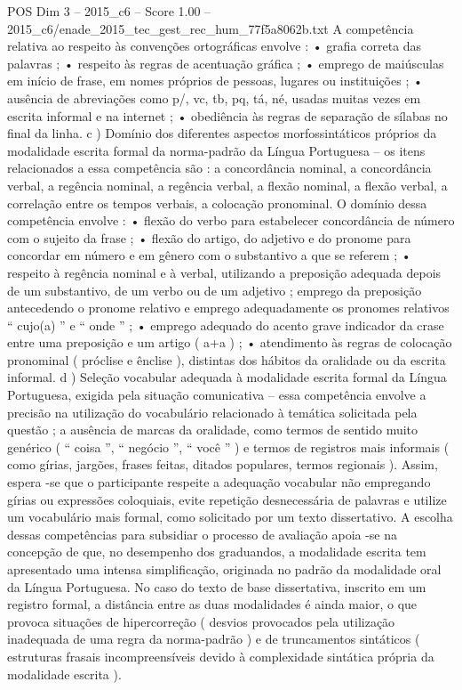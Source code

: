 \begin{textsample}{POS Dim 3 – 2015\_c6 – Score 1.00 – 2015\_c6/enade\_2015\_tec\_gest\_rec\_hum\_77f5a8062b.txt}
A competência relativa ao respeito às convenções ortográficas envolve : • grafia correta das palavras ; • respeito às regras de acentuação gráfica ; • emprego de maiúsculas em início de frase, em nomes próprios de pessoas, lugares ou instituições ; • ausência de abreviações como p/, vc, tb, pq, tá, né, usadas muitas vezes em escrita informal e na internet ; • obediência às regras de separação de sílabas no final da linha. c ) Domínio dos diferentes aspectos morfossintáticos próprios da modalidade escrita formal da norma-padrão da Língua Portuguesa – os itens relacionados a essa competência são : a concordância nominal, a concordância verbal, a regência nominal, a regência verbal, a flexão nominal, a flexão verbal, a correlação entre os tempos verbais, a colocação pronominal.
O domínio dessa competência envolve : • flexão do verbo para estabelecer concordância de número com o sujeito da frase ; • flexão do artigo, do adjetivo e do pronome para concordar em número e em gênero com o substantivo a que se referem ; • respeito à regência nominal e à verbal, utilizando a preposição adequada depois de um substantivo, de um verbo ou de um adjetivo ; emprego da preposição antecedendo o pronome relativo e emprego adequadamente os pronomes relativos “ cujo(a) ” e “ onde ” ; • emprego adequado do acento grave indicador da crase entre uma preposição e um artigo ( a+a ) ; • atendimento às regras de colocação pronominal ( próclise e ênclise ), distintas dos hábitos da oralidade ou da escrita informal. d ) Seleção vocabular adequada à modalidade escrita formal da Língua Portuguesa, exigida pela situação comunicativa – essa competência envolve a precisão na utilização do vocabulário relacionado à temática solicitada pela questão ; a ausência de marcas da oralidade, como termos de sentido muito genérico ( “ coisa ”, “ negócio ”, “ você ” ) e termos de registros mais informais ( como gírias, jargões, frases feitas, ditados populares, termos regionais ).
Assim, espera -se que o participante respeite a adequação vocabular não empregando gírias ou expressões coloquiais, evite repetição desnecessária de palavras e utilize um vocabulário mais formal, como solicitado por um texto dissertativo.
A escolha dessas competências para subsidiar o processo de avaliação apoia -se na concepção de que, no desempenho dos graduandos, a modalidade escrita tem apresentado uma intensa simplificação, originada no padrão da modalidade oral da Língua Portuguesa.
No caso do texto de base dissertativa, inscrito em um registro formal, a distância entre as duas modalidades é ainda maior, o que provoca situações de hipercorreção ( desvios provocados pela utilização inadequada de uma regra da norma-padrão ) e de truncamentos sintáticos ( estruturas frasais incompreensíveis devido à complexidade sintática própria da modalidade escrita ).

\end{textsample}
